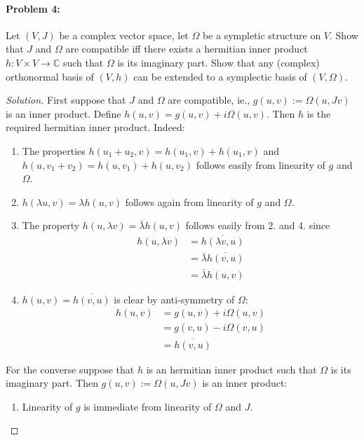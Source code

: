 \paragraph{Problem 4:} Let $(V,J)$ be a complex vector space, let $\Omega$ be a sympletic structure on $V$. Show that $J$ and $\Omega$ are compatible iff there exists a hermitian inner product $h:V\times V\to \mathbb{C}$ such that $\Omega$ is its imaginary part. Show that any (complex) orthonormal basis of  $(V,h)$ can be extended to a symplectic basis of $(V,\Omega)$.

\begin{proof}[Solution]\leavevmode
	First suppose that $J$ and $\Omega$ are compatible, ie., $g(u,v):=\Omega(u,Jv)$ is an inner product. Define $h(u,v)=g(u,v)+i\Omega(u,v)$. Then  $h$ is the required hermitian inner product. Indeed:

	\begin{enumerate}
		\item The properties $h(u_1+u_2,v)=h(u_1,v)+h(u_1,v)$ and  $h(u,v_1+v_2)=h(u,v_1)+h(u,v_2)$ follows easily from linearity of $g$ and $\Omega$.
		
		\item $h(\lambda u,v)=\lambda h(u,v)$ follows again from linearity of $g$ and $\Omega$.

		\item The property $h(u,\lambda v)=\bar{\lambda} h(u,v)$ follows easily from 2. and 4. since 
			\begin{align*}
				h(u,\lambda v)& =\overline{h(\lambda v, u)}\\
				& =\bar{\lambda} \overline{h(v,u)}\\
				& =\bar{\lambda} h(u,v)
			\end{align*}

		\item $h(u,v)=\overline{h(v,u)}$ is clear by anti-symmetry of $\Omega$:
			\begin{align*}
				h(u,v)& =g(u,v)+i\Omega(u,v)\\
				& =g(v,u)-i\Omega(v,u)\\
				& =\overline{h(v,u)}
			\end{align*}
	\end{enumerate}
	For the converse suppose that $h$ is an hermitian inner product such that $\Omega$ is its imaginary part. Then $g(u,v):=\Omega(u,Jv)$ is an inner product:
	\begin{enumerate}
		\item Linearity of $g$ is immediate from linearity of $\Omega$ and $J$.


\end{enumerate}
\end{proof}

